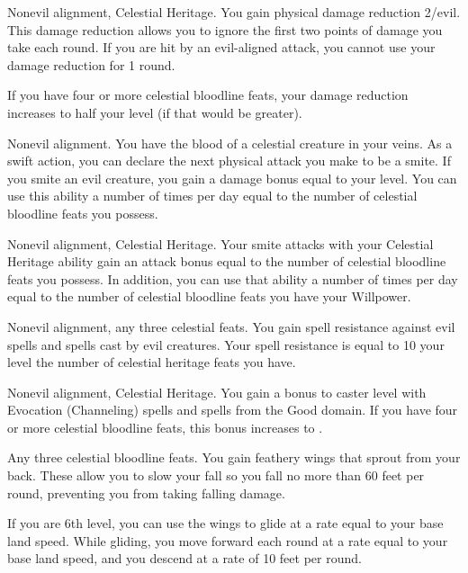 \featpres
Nonevil alignment, Celestial Heritage.
\featben You gain physical damage reduction 2/evil.
This damage reduction allows you to ignore the first two points of damage you take each round.
If you are hit by an evil-aligned attack, you cannot use your damage reduction for 1 round.

If you have four or more celestial bloodline feats, your damage reduction increases to half your level (if that would be greater).

\featpre Nonevil alignment.
\featben You have the blood of a celestial creature in your veins.
As a swift action, you can declare the next physical attack you make to be a smite.
If you smite an evil creature, you gain a damage bonus equal to your level.
You can use this ability a number of times per day equal to the number of celestial bloodline feats you possess.

\featpres
Nonevil alignment, Celestial Heritage.
\featben Your smite attacks with your Celestial Heritage ability gain an attack bonus equal to the number of celestial bloodline feats you possess.
In addition, you can use that ability a number of times per day equal to the number of celestial bloodline feats you have \add your Willpower.

\featpres
Nonevil alignment, any three celestial feats.
\featben You gain spell resistance against evil spells and spells cast by evil creatures.
Your spell resistance is equal to 10 \add your level \add the number of celestial heritage feats you have.

\featpres
Nonevil alignment, Celestial Heritage.
\featben You gain a  bonus to caster level with Evocation (Channeling) spells and spells from the Good domain.
If you have four or more celestial bloodline feats, this bonus increases to .

\featpre Any three celestial bloodline feats.
\featben You gain feathery wings that sprout from your back.
These allow you to slow your fall so you fall no more than 60 feet per round, preventing you from taking falling damage.

If you are 6th level, you can use the wings to glide at a rate equal to your base land speed.
While gliding, you move forward each round at a rate equal to your base land speed, and you descend at a rate of 10 feet per round.

